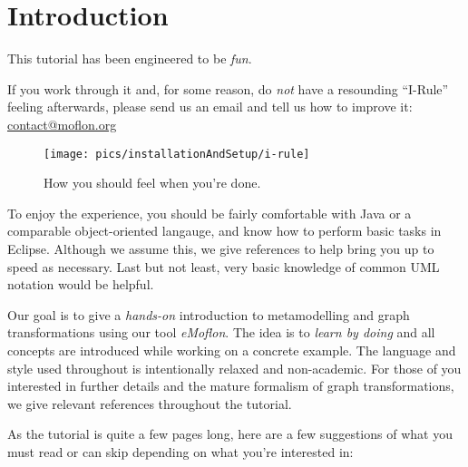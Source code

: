 \chapter{Introduction}
\label{chap:introduction}

This tutorial has been engineered to be \emph{fun}.

If you work through it and, for some reason, do \emph{not} have a resounding \mbox{``I-Rule''} feeling afterwards, please send us an email and tell us how to improve it: \url{contact@moflon.org}

\begin{figure}[htp]
\begin{center}
  \texttt{[image: pics/installationAndSetup/i-rule]}
  \caption{How you should feel when you're done.}
  \label{i-rule}
\end{center}
\end{figure}

To enjoy the experience, you should be fairly comfortable with Java or a comparable object-oriented langauge, and know how to perform basic tasks in Eclipse.  Although we assume this, we give references to help bring you up to speed as necessary.  
Last but not least, very basic knowledge of common UML notation would be helpful.

Our goal is to give a \emph{hands-on} introduction to metamodelling and graph transformations using our tool \emph{eMoflon}.
The idea is to \emph{learn by doing} and all concepts are introduced while working on a concrete example.
The language and style used throughout is intentionally relaxed and non-academic.
For those of you interested in further details and the mature formalism of graph transformations, we give relevant references throughout the tutorial.

As the tutorial is quite a few pages long, here are a few suggestions of what you must read or can skip depending on what you're interested in:

